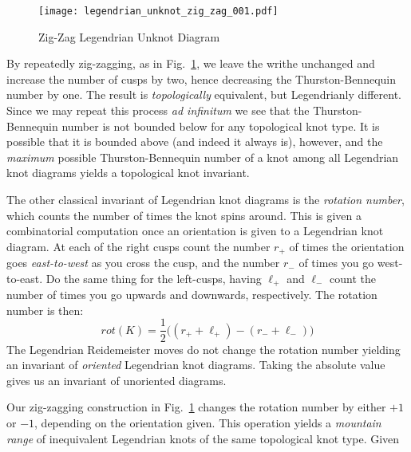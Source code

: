     \par\hfill\par
    \begin{figure}
        \centering
        \texttt{[image: legendrian\_unknot\_zig\_zag\_001.pdf]}
        \caption{Zig-Zag Legendrian Unknot Diagram}
        \label{fig:legendrian_unknot_zig_zag_001}
    \end{figure}
    By repeatedly zig-zagging, as in
    Fig.~\ref{fig:legendrian_unknot_zig_zag_001}, we leave the writhe unchanged
    and increase the number of cusps by two, hence decreasing the
    Thurston-Bennequin number by one. The result is \textit{topologically}
    equivalent, but Legendrianly different. Since we may repeat this process
    \textit{ad infinitum} we see that the Thurston-Bennequin number is not
    bounded below for any topological knot type. It is possible that it is
    bounded above (and indeed it always is),
    however, and the \textit{maximum} possible
    Thurston-Bennequin number of a knot among all Legendrian knot diagrams
    yields a topological knot invariant.
    \par\hfill\par
    The other classical invariant of Legendrian knot diagrams is the
    \textit{rotation number}, which counts the number of times the knot spins
    around. This is given a combinatorial computation once an orientation is
    given to a Legendrian knot diagram. At each of the right cusps count the
    number $r_{+}$ of times the orientation goes \textit{east-to-west} as you
    cross the cusp, and the number $r_{-}$ of times you go west-to-east.
    Do the same thing for the left-cusps, having $\ell_{+}$ and $\ell_{-}$
    count the number of times you go upwards and downwards, respectively.
    The rotation number is then:
    \begin{equation}
        rot(K)=\frac{1}{2}\big((r_{+}+\ell_{+})-(r_{-}+\ell_{-})\big)
    \end{equation}
    The Legendrian Reidemeister moves do not change the rotation number yielding
    an invariant of \textit{oriented} Legendrian knot diagrams. Taking the
    absolute value gives us an invariant of unoriented diagrams.
    \par\hfill\par
    Our zig-zagging construction in Fig.~\ref{fig:legendrian_unknot_zig_zag_001}
    changes the rotation number by either $+1$ or $-1$, depending on the
    orientation given. This operation yields a \textit{mountain range} of
    inequivalent Legendrian knots of the same topological knot type. Given

